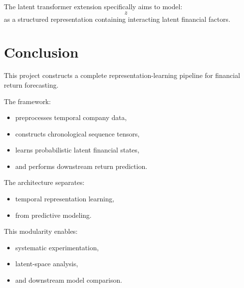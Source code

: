 \documentclass[11pt]{article}
\begin{document}
The latent transformer extension specifically aims to model:
\[
z
\]
as a structured representation containing interacting latent financial factors.

\section{Conclusion}

This project constructs a complete representation-learning pipeline for financial return forecasting.

The framework:
\begin{itemize}
    \item preprocesses temporal company data,
    \item constructs chronological sequence tensors,
    \item learns probabilistic latent financial states,
    \item and performs downstream return prediction.
\end{itemize}

The architecture separates:
\begin{itemize}
    \item temporal representation learning,
    \item from predictive modeling.
\end{itemize}

This modularity enables:
\begin{itemize}
    \item systematic experimentation,
    \item latent-space analysis,
    \item and downstream model comparison.
\end{itemize}
\end{document}
